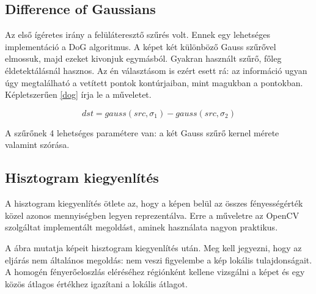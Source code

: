 \subsection{Difference of Gaussians}\label{sect:DoG}

Az első ígéretes irány a felüláteresztő szűrés volt.
Ennek egy lehetséges implementáció a DoG algoritmus.
A képet két különböző Gauss szűrővel elmossuk, majd ezeket kivonjuk egymásból.
Gyakran használt szűrő, főleg éldetektálásnál hasznos.
Az én választásom is ezért esett rá: az információ ugyan úgy megtalálható a vetített pontok kontúrjaiban, mint magukban a pontokban.
Képletszerűen \eqref{dog} írja le a műveletet. 

\begin{equation}
dst = gauss(src, \sigma_1) - gauss(src, \sigma_2)
\label{eq:dog}
\end{equation}

A szűrőnek 4 lehetséges paramétere van: a két Gauss szűrő kernel mérete valamint szórása.

\subsection{Hisztogram kiegyenlítés}\label{sect:histNorm}

A hisztogram kiegyenlítés ötlete az, hogy a képen belül az összes fényességérték közel azonos mennyiségben legyen reprezentálva.
Erre a műveletre az OpenCV szolgáltat implementált megoldást, aminek használata nagyon praktikus.

A  ábra mutatja  képeit hisztogram kiegyenlítés után.
Meg kell jegyezni, hogy az eljárás nem általános megoldás: nem veszi figyelembe a kép lokális tulajdonságait.
A homogén fényerőeloszlás eléréséhez régiónként kellene vizsgálni a képet és egy közös átlagos értékhez igazítani a lokális átlagot.

